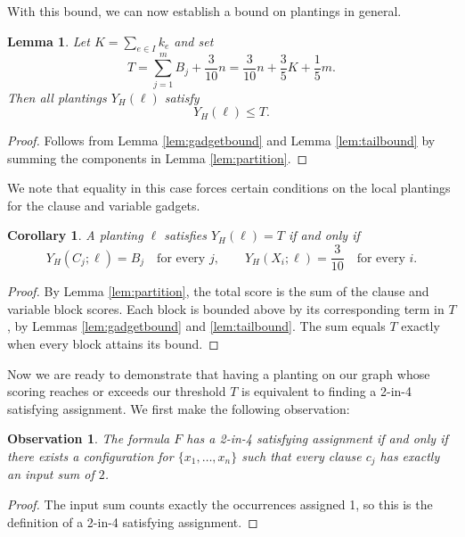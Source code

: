 \documentclass[11pt]{article}
\theoremstyle{plain}
\newtheorem{lemma}[theorem]{Lemma}
\newtheorem{observation}[theorem]{Observation}
\newtheorem{corollary}[theorem]{Corollary}
\begin{document}
With this bound, we can now establish a bound on plantings in general.

\begin{lemma} \label{lem:plantbound}
    Let $K = \sum_{e\in I}k_e$ and set 
    \[T= \sum_{j=1}^m B_j + \frac{3}{10}n = \frac{3}{10}n + \frac{3}{5}K + \frac{1}{5}m.\] 
    Then all plantings $Y_H(\ell)$ satisfy
    \[Y_H(\ell) \leq T.\] 
\end{lemma}

\begin{proof}
    Follows from Lemma \ref{lem:gadgetbound} and Lemma \ref{lem:tailbound} by summing the components in Lemma \ref{lem:partition}.
\end{proof}

We note that equality in this case forces certain conditions on the local plantings for the clause and variable gadgets.

\begin{corollary} \label{cor:thresholdgadgetbound}
    A planting $\ell$ satisfies $Y_H(\ell)=T$ if and only if
    \[
    Y_H(C_j;\ell)=B_j \quad\text{for every }j,
    \qquad
    Y_H(X_i;\ell)=\frac{3}{10}
    \quad\text{for every }i.
    \]
\end{corollary}

\begin{proof}
    By Lemma \ref{lem:partition}, the total score is the sum of the clause and variable block scores.
    Each block is bounded above by its corresponding term in $T$, by Lemmas \ref{lem:gadgetbound}
    and \ref{lem:tailbound}. The sum equals $T$ exactly when every block attains its bound.
\end{proof}

Now we are ready to demonstrate that having a planting on our graph whose scoring reaches or exceeds our threshold $T$ is equivalent to finding a 2-in-4 satisfying assignment. We first make the following observation:

\begin{observation} \label{obs:sattogadget}
    The formula $F$ has a 2-in-4 satisfying assignment if and only if there exists a configuration for $\{x_1, \dots, x_n\}$ such that every clause $c_j$ has exactly an input sum of $2$. 
\end{observation}

\begin{proof}
    The input sum counts exactly the occurrences assigned 1, so this is the definition of a 2-in-4 satisfying assignment.
\end{proof}
\end{document}
